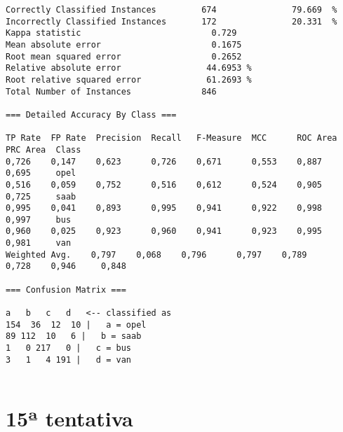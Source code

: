 \documentclass[
	article,			%
	11pt,				%
	oneside,			%
	a4paper,			%
	english,			%
	brazil,				%
	sumario=tradicional
	]{abntex2}
\begin{document}
\begin{lstlisting}
Correctly Classified Instances         674               79.669  %
Incorrectly Classified Instances       172               20.331  %
Kappa statistic                          0.729 
Mean absolute error                      0.1675
Root mean squared error                  0.2652
Relative absolute error                 44.6953 %
Root relative squared error             61.2693 %
Total Number of Instances              846     

=== Detailed Accuracy By Class ===

TP Rate  FP Rate  Precision  Recall   F-Measure  MCC      ROC Area  PRC Area  Class
0,726    0,147    0,623      0,726    0,671      0,553    0,887     0,695     opel
0,516    0,059    0,752      0,516    0,612      0,524    0,905     0,725     saab
0,995    0,041    0,893      0,995    0,941      0,922    0,998     0,997     bus
0,960    0,025    0,923      0,960    0,941      0,923    0,995     0,981     van
Weighted Avg.    0,797    0,068    0,796      0,797    0,789      0,728    0,946     0,848     

=== Confusion Matrix ===

a   b   c   d   <-- classified as
154  36  12  10 |   a = opel
89 112  10   6 |   b = saab
1   0 217   0 |   c = bus
3   1   4 191 |   d = van


\end{lstlisting}

\newpage

\section{15ª tentativa}
\end{document}
